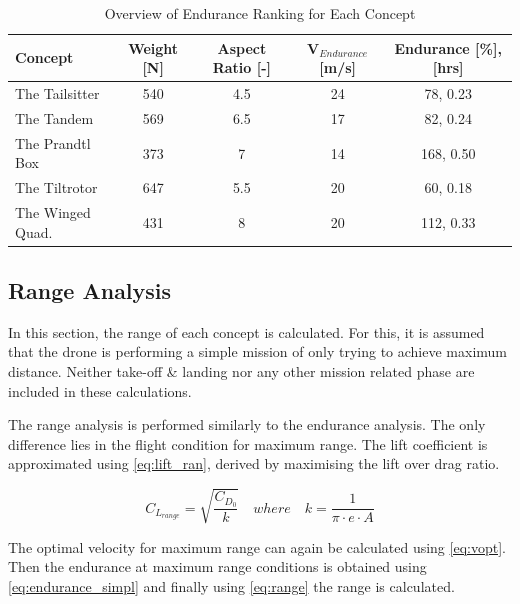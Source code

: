 \begin{table}[htb]
    \centering
    \caption{Overview of Endurance Ranking for Each Concept}
    \label{tab:trade_endu}
    \begin{adjustbox}{width=1\textwidth}
    \small
        \begin{tabular}{lcccc}
        \toprule
        \textbf{Concept} & \textbf{Weight [N]} & \textbf{Aspect Ratio [-]} & \textbf{V$_{Endurance}$ [m/s] }& \textbf{Endurance [\%], [hrs]} \\ \midrule
        The Tailsitter          &540   &4.5 &24  & 78, 0.23\\\hdashline
        The Tandem              &569   &6.5 & 17 & 82, 0.24\\\hdashline
        The Prandtl Box         &373   &7  & 14& 168, 0.50\\\hdashline
        The Tiltrotor           &647   &5.5   & 20 & 60, 0.18\\\hdashline
        The Winged Quad.        &431   &8   &20 & 112, 0.33\\\bottomrule
        \end{tabular}
        \end{adjustbox}
\end{table}



\subsection{Range Analysis}
\label{sec:range_ana}
In this section, the range of each concept is calculated. For this, it is assumed that the drone is performing a simple mission of only trying to achieve maximum distance. Neither take-off \& landing nor any other mission related phase are included in these calculations. 

The range analysis is performed similarly to the endurance analysis. The only difference lies in the flight condition for maximum range. The lift coefficient is approximated using \autoref{eq:lift_ran}, derived by maximising the lift over drag ratio. 

\begin{equation}
    C_{L_{range}} = \sqrt{\frac{C_{D_0}}{k}} \quad where \quad k=\frac{1}{\pi\cdot e\cdot A}
    \label{eq:lift_ran}
\end{equation}

The optimal velocity for maximum range can again be calculated using \autoref{eq:vopt}. Then the endurance at maximum range conditions is obtained using \autoref{eq:endurance_simpl} and finally using \autoref{eq:range} the range is calculated.

